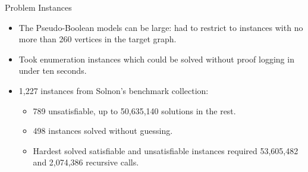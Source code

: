 \documentclass{beamer}
\begin{document}
\begin{frame}{Problem Instances}
    \begin{itemize}
        \item The Pseudo-Boolean models can be large: had to restrict to instances with no more than
            260 vertices in the target graph.
        \item Took enumeration instances which could be solved without proof logging in under ten seconds.
        \item 1,227 instances from Solnon's benchmark collection:
            \begin{itemize}
                \item 789 unsatisfiable, up to 50,635,140 solutions in the rest.
                \item 498 instances solved without guessing.
                \item Hardest solved satisfiable and unsatisfiable instances required 53,605,482 and
                    2,074,386 recursive calls.
            \end{itemize}
    \end{itemize}
\end{frame}
\end{document}
